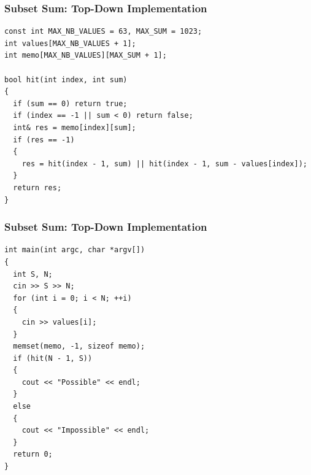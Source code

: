 \documentclass{beamer}
\begin{document}
\begin{frame}
\end{frame}

\begin{frame}[containsverbatim]
\frametitle{Subset Sum: Top-Down Implementation}

\scriptsize
\begin{lstlisting}
const int MAX_NB_VALUES = 63, MAX_SUM = 1023;
int values[MAX_NB_VALUES + 1];
int memo[MAX_NB_VALUES][MAX_SUM + 1];

bool hit(int index, int sum)
{
  if (sum == 0) return true;
  if (index == -1 || sum < 0) return false;
  int& res = memo[index][sum];
  if (res == -1)
  {
    res = hit(index - 1, sum) || hit(index - 1, sum - values[index]);
  }
  return res;
}
\end{lstlisting}

\end{frame}

\begin{frame}[containsverbatim]
\frametitle{Subset Sum: Top-Down Implementation}

\scriptsize
\begin{lstlisting}
int main(int argc, char *argv[])
{
  int S, N;
  cin >> S >> N;
  for (int i = 0; i < N; ++i)
  {
    cin >> values[i];
  }
  memset(memo, -1, sizeof memo);
  if (hit(N - 1, S))
  {
    cout << "Possible" << endl;
  }
  else
  {
    cout << "Impossible" << endl;
  }
  return 0;
}
\end{lstlisting}

\end{frame}
\end{document}
